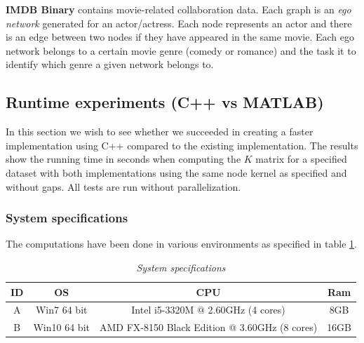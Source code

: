 \documentclass{article}
\begin{document}
\textbf{IMDB Binary} \cite{yanardag} contains movie-related collaboration data. Each graph is an \textit{ego network} generated for an actor/actress. Each node represents an actor and there is an edge between two nodes if they have appeared in the same movie. Each ego network belongs to a certain movie genre (comedy or romance) and the task it to identify which genre a given network belongs to.

\subsection{Runtime experiments (C++ vs MATLAB)}
In this section we wish to see whether we succeeded in creating a faster implementation using C++ compared to the existing implementation. The results show the running time in seconds when computing the $K$ matrix for a specified dataset with both implementations using the same node kernel as specified and without gaps. All tests are run without parallelization.

\subsubsection{System specifications}
The computations have been done in various environments as specified in table \ref{table:specs}.
\begin{table}[H]
	\centering
	\hspace*{-0.7in}
	\scalebox{0.7} {
		\begin{tabular}{c|c|c|c}
			ID & OS & CPU & Ram\\
			\hline
			A & Win7 64 bit & Intel i5-3320M @ 2.60GHz (4 cores) & 8GB \\
			\hline
			B & Win10 64 bit & AMD FX-8150 Black Edition @ 3.60GHz (8 cores) & 16GB
			
		\end{tabular}
	}
	
	\caption{\textit{System specifications}}
	\label{table:specs}
\end{table}
\end{document}
